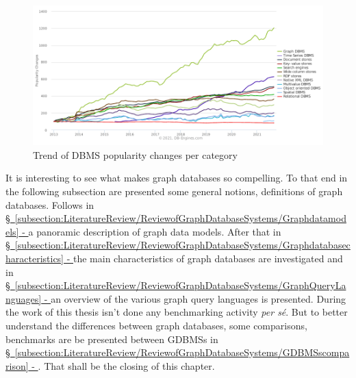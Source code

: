 \begin{figure}[H]%
	\centering%
	\includegraphics[width=1\textwidth-4pt,%
		bgcolor=white,%
		cfbox=lightestgray %
			  2pt %
			  0pt %
			  0pt %
	]{images/chapter2/solid2021popularitychange.pdf}%
	\caption[Trend of DBMS popularity changes per category]{Trend of DBMS popularity changes per category}%
	\label{fig:solid2021popularitychange}%
\end{figure}%

It is interesting to see what makes graph databases so compelling.
To that end in the following subsection are presented some general notions, definitions of graph databases.
Follows in \hyperref[subsection:LiteratureReview/ReviewofGraphDatabaseSystems/Graphdatamodels]{\S\ \ref{subsection:LiteratureReview/ReviewofGraphDatabaseSystems/Graphdatamodels} - } a panoramic description of graph data models.
After that in \hyperref[subsection:LiteratureReview/ReviewofGraphDatabaseSystems/Graphdatabasecharacteristics]{\S\ \ref{subsection:LiteratureReview/ReviewofGraphDatabaseSystems/Graphdatabasecharacteristics} - } the main characteristics of graph databases are investigated and in \hyperref[subsection:LiteratureReview/ReviewofGraphDatabaseSystems/GraphQueryLanguages]{\S\ \ref{subsection:LiteratureReview/ReviewofGraphDatabaseSystems/GraphQueryLanguages} - } an overview of the various graph query languages is presented.
During the work of this thesis isn't done any benchmarking activity \textit{per sé}.
But to better understand the differences between graph databases, some comparisons, benchmarks are be presented between GDBMSs in \hyperref[subsection:LiteratureReview/ReviewofGraphDatabaseSystems/GDBMSscomparison]{\S\ \ref{subsection:LiteratureReview/ReviewofGraphDatabaseSystems/GDBMSscomparison} - }.
That shall be the closing of this chapter.


